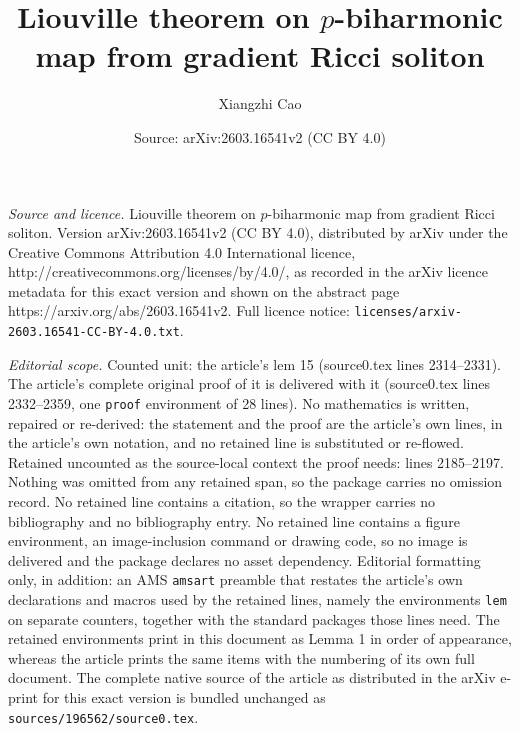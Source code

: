 \documentclass[10pt,a4paper]{amsart}
\title{Liouville theorem on $p$-biharmonic map from gradient Ricci soliton}
\author{Xiangzhi Cao}
\date{Source: arXiv:2603.16541v2 (CC BY 4.0)}
\begin{document}
\maketitle

\noindent\emph{Source and licence.} Liouville theorem on $p$-biharmonic map from gradient Ricci soliton. Version arXiv:2603.16541v2 (CC BY 4.0), distributed by arXiv under the Creative Commons Attribution 4.0 International licence, http://creativecommons.org/licenses/by/4.0/, as recorded in the arXiv licence metadata for this exact version and shown on the abstract page https://arxiv.org/abs/2603.16541v2. Full licence notice: \texttt{licenses/arxiv-2603.16541-CC-BY-4.0.txt}.\par\smallskip

\noindent\textit{Editorial scope.} Counted unit: the article's lem 15 (source0.tex lines 2314--2331). The article's complete original proof of it is delivered with it (source0.tex lines 2332--2359, one \texttt{proof} environment of 28 lines). No mathematics is written, repaired or re-derived: the statement and the proof are the article's own lines, in the article's own notation, and no retained line is substituted or re-flowed.  Retained uncounted as the source-local context the proof needs: lines 2185--2197.  Nothing was omitted from any retained span, so the package carries no omission record.  No retained line contains a citation, so the wrapper carries no bibliography and no bibliography entry.  No retained line contains a figure environment, an image-inclusion command or drawing code, so no image is delivered and the package declares no asset dependency.  Editorial formatting only, in addition: an AMS \texttt{amsart} preamble that restates the article's own declarations and macros used by the retained lines, namely the environments \texttt{lem} on separate counters, together with the standard packages those lines need.  The retained environments print in this document as Lemma 1 in order of appearance, whereas the article prints the same items with the numbering of its own full document.  The complete native source of the article as distributed in the arXiv e-print for this exact version is bundled unchanged as \texttt{sources/196562/source0.tex}.
\end{document}
